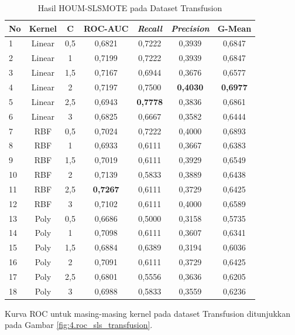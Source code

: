 \begin{table}[H]
\centering
\caption{Hasil HOUM-SLSMOTE pada Dataset Transfusion}
\label{table:4.sls_transfusion}
\footnotesize
\begin{tabular}{|l|c|c|c|c|c|c|}
\hline
\textbf{No} & \textbf{Kernel} & \textbf{C} & \textbf{ROC-AUC} & \textbf{\textit{Recall}} & \textbf{\textit{Precision}} & \textbf{G-Mean} \\
\hline
1 & Linear & 0,5 & 0,6821 & 0,7222 & 0,3939 & 0,6847 \\
\hline
2 & Linear & 1 & 0,7199 & 0,7222 & 0,3939 & 0,6847 \\
\hline
3 & Linear & 1,5 & 0,7167 & 0,6944 & 0,3676 & 0,6577 \\
\hline
4 & Linear & 2 & 0,7197 & 0,7500 & \textbf{0,4030} & \textbf{0,6977} \\
\hline
5 & Linear & 2,5 & 0,6943 & \textbf{0,7778} & 0,3836 & 0,6861 \\
\hline
6 & Linear & 3 & 0,6825 & 0,6667 & 0,3582 & 0,6444 \\
\hline
7 & RBF & 0,5 & 0,7024 & 0,7222 & 0,4000 & 0,6893 \\
\hline
8 & RBF & 1 & 0,6933 & 0,6111 & 0,3667 & 0,6383 \\
\hline
9 & RBF & 1,5 & 0,7019 & 0,6111 & 0,3929 & 0,6549 \\
\hline
10 & RBF & 2 & 0,7139 & 0,5833 & 0,3889 & 0,6438 \\
\hline
11 & RBF & 2,5 & \textbf{0,7267} & 0,6111 & 0,3729 & 0,6425 \\
\hline
12 & RBF & 3 & 0,7102 & 0,6111 & 0,4000 & 0,6589 \\
\hline
13 & Poly & 0,5 & 0,6686 & 0,5000 & 0,3158 & 0,5735 \\
\hline
14 & Poly & 1 & 0,7098 & 0,6111 & 0,3607 & 0,6341 \\
\hline
15 & Poly & 1,5 & 0,6884 & 0,6389 & 0,3194 & 0,6036 \\
\hline
16 & Poly & 2 & 0,7091 & 0,6111 & 0,3729 & 0,6425 \\
\hline
17 & Poly & 2,5 & 0,6801 & 0,5556 & 0,3636 & 0,6205 \\
\hline
18 & Poly & 3 & 0,6988 & 0,5833 & 0,3559 & 0,6236 \\
\hline
\end{tabular}
\end{table}

Kurva ROC untuk masing-masing kernel pada dataset Transfusion ditunjukkan pada Gambar \ref{fig:4.roc_sls_transfusion}.

